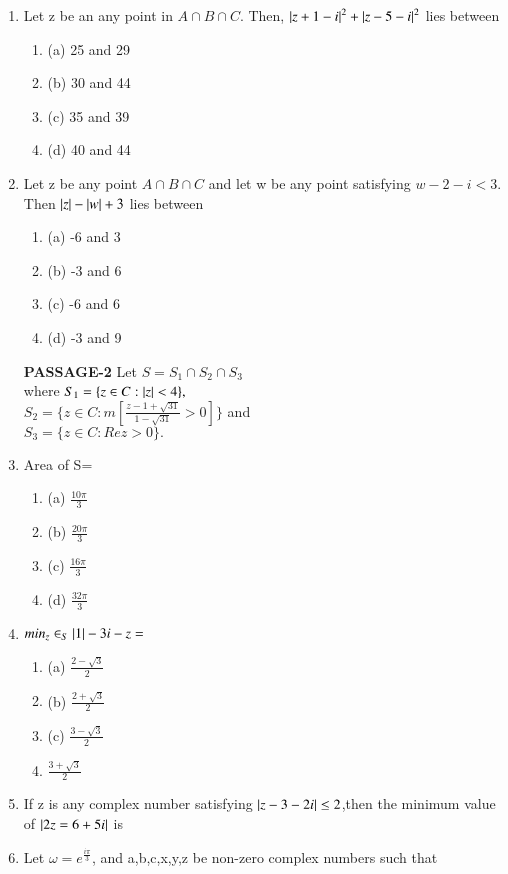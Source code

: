 \begin{enumerate}[label=\arabic*.,ref=\thesubsection.\theenumi]
    \item Let z be an any point in $A\cap B \cap C$.
    Then, $\left\vert z+1-i\right\vert^2+\left\vert z-5-i\right\vert^2$ lies between
    \begin{enumerate}
    \item (a) 25 and 29   
    \item (b) 30 and 44    
    \item (c) 35 and 39    
    \item (d) 40 and 44
    \end{enumerate}
    \item Let z be any point $A\cap B \cap C$ and let w be any point satisfying $w-2-i < 3$. Then $\left\vert z\right\vert -\left\vert w\right\vert +3$ lies between     
    \begin{enumerate}
    \item (a) -6 and 3    
    \item (b)  -3 and 6    
    \item (c)  -6 and 6    
    \item (d)  -3 and 9
\end{enumerate}
\textbf{PASSAGE-2}
Let $S = S_1\cap S_2\cap S_3$\\
where $S_1 = \{z\in C : \left\vert z\right\vert < 4\},$\\
$S_2 = \{z \in C:m[\frac{z-1+\sqrt{31}}{1-\sqrt{31}}>0]\}$ and \\ 
$S_3 = \{z \in C :Rez>0\}.$
	\item Area of S=
    \begin{enumerate}
    \item (a) $\frac{10\pi}{3}$    
    \item (b) $\frac{20\pi}{3}$    
    \item (c) $\frac{16\pi}{3}$    
    \item (d) $\frac{32\pi}{3}$
    \end{enumerate}
    \item $min_z \in_S\left\vert1\right\vert-3i-z=$
    \begin{enumerate}
    \item (a) $\frac{2-\sqrt 3}{2}$    
    \item (b) $\frac{2+\sqrt 3}{2}$    
    \item (c) $\frac{3-\sqrt 3}{2}$    
    \item $\frac{3+\sqrt 3}{2}$
    \end{enumerate} 
        \item If z is any complex number satisfying  $\left\vert z-3-2i\right\vert \leq 2$,then the minimum value of 
        $\left\vert 2z=6+5i\right\vert$ is
        \item Let $\omega = e^\frac{i\pi}{3}$, and a,b,c,x,y,z be non-zero complex numbers such that 

\end{enumerate}
